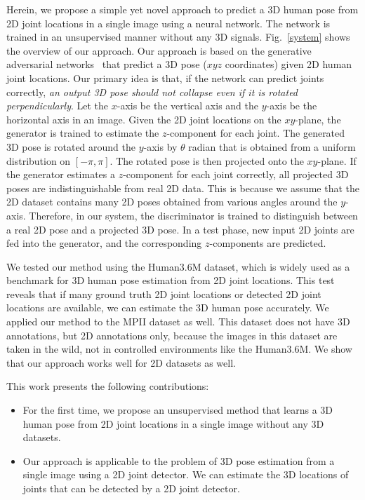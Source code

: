 \documentclass[runningheads]{llncs}
\newcommand{\Fref}[1]{Fig.~\ref{#1}}
\begin{document}
Herein, we propose a simple yet novel approach to predict a 3D human pose from 2D joint locations in a single image using a neural network.
The network is trained in an unsupervised manner without any 3D signals. 
\Fref{system} shows the overview of our approach.
Our approach is based on the generative adversarial networks~\cite{goodfellow2014generative} that predict a 3D pose ($xyz$ coordinates) given 2D human joint locations.
Our primary idea is that, if the network can predict joints correctly,
\textit{an output 3D pose should not collapse even if it is rotated perpendicularly}.
Let the $x$-axis be the vertical axis and the $y$-axis be the horizontal axis in an image.
Given the 2D joint locations on the $xy$-plane, the generator is trained to estimate the $z$-component for each joint.
The generated 3D pose is rotated around the $y$-axis by $\theta$ radian that is obtained from a uniform distribution on $[-\pi, \pi]$.
The rotated pose is then projected onto the $xy$-plane.
If the generator estimates a $z$-component for each joint correctly, all projected 3D poses are indistinguishable from real 2D data.
This is because we assume that the 2D dataset contains many 2D poses obtained from various angles around the $y$-axis.
Therefore, in our system, the discriminator is trained to distinguish between a real 2D pose and a projected 3D pose.
In a test phase, new input 2D joints are fed into the generator, and the corresponding $z$-components are predicted.

We tested our method using the Human3.6M dataset, which is widely used as a benchmark for 3D human pose estimation from 2D joint locations.
This test reveals that if many ground truth 2D joint locations or detected 2D joint locations are available, we can estimate the 3D human pose accurately.
We applied our method to the MPII dataset as well.
This dataset does not have 3D annotations, but 2D annotations only, because the images in this dataset are taken in the wild, not in controlled environments like the Human3.6M.
We show that our approach works well for 2D datasets as well.

This work presents the following contributions:
\begin{itemize}
\item For the first time, we propose an unsupervised method that learns a 3D human pose from 2D joint locations in a single image without any 3D datasets.
\item Our approach is applicable to the problem of 3D pose estimation from a single image using a 2D joint detector. We can estimate the 3D locations of joints that can be detected by a 2D joint detector.
\end{itemize}
\end{document}
